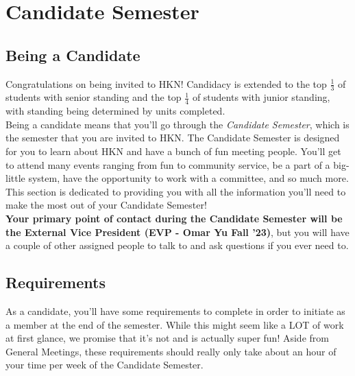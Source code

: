 \documentclass[11pt, article, oneside]{memoir}
\begin{document}
    \newpage
    \chapter{Candidate Semester}
    \label{ch:candidate-semester}

    \section{Being a Candidate}
    \label{sec:being-a-candidate}
        Congratulations on being invited to HKN!
        Candidacy is extended to the top \(\frac{1}{3}\) of students with senior standing and the top \(\frac{1}{4}\) of students with junior standing, with standing being determined by units completed. \\
        
        Being a candidate means that you'll go through the \emph{Candidate Semester}, which is the semester that you are invited to HKN.
        The Candidate Semester is designed for you to learn about HKN and have a bunch of fun meeting people.
        You'll get to attend many events ranging from fun to community service, be a part of a big-little system, have the opportunity to work with a committee, and so much more.
        This section is dedicated to providing you with all the information you'll need to make the most out of your Candidate Semester! \\

        \textbf{Your primary point of contact during the Candidate Semester will be the External Vice President (EVP - Omar Yu Fall '23)}, but you will have a couple of other assigned people to talk to and ask questions if you ever need to.


    \section{Requirements}
        As a candidate, you'll have some requirements to complete in order to initiate as a member at the end of the semester.
        While this might seem like a LOT of work at first glance, we promise that it's not and is actually super fun!
        Aside from General Meetings, these requirements should really only take about an hour of your time per week of the Candidate Semester. \\
        
\end{document}
